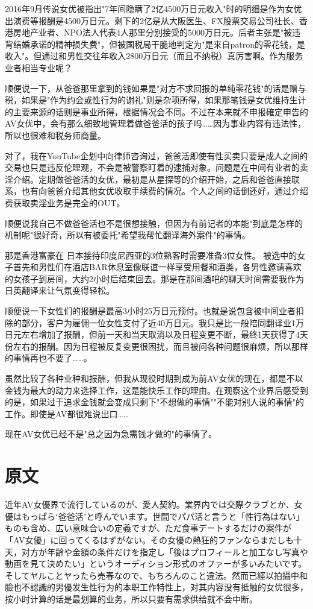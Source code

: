 \documentclass[12pt,UTF8]{ctexbook}
\begin{document}
2016年9月传说女优被指出"7年间隐瞒了2亿4500万日元收入"时的明细是作为女优出演费等报酬是4500万日元。剩下的2亿是从大阪医生、FX股票交易公司社长、香港房地产业者、NPO法人代表4人那里分别接受的5000万日元。后者主张是"被违背结婚承诺的精神损失费"，但被国税局干脆地判定为"是来自patron的零花钱，是收入"。但通过和男性交往年收入2800万日元（而且不纳税）真厉害啊。作为服务业者相当专业呢？

顺便说一下，从爸爸那里拿到的钱如果是"对方不求回报的单纯零花钱"的话是赠与税，如果是"作为约会或性行为的谢礼"则是杂项所得，如果那笔钱是女优维持生计的主要来源的话则是事业所得，根据情况会不同。不过在本来就不申报確定申告的AV女优中，会有那么细致地管理着做爸爸活的孩子吗……因为事业内容有违法性，所以也很难和税务师商量。

对了，我在YouTube企划中向律师咨询过，爸爸活即使有性买卖只要是成人之间的交易也只是违反伦理观，不会是被警察盯着的逮捕对象。问题是在中间有业者的卖淫介绍。定期做爸爸活的女优，最初是从星探等的介绍开始，之后和爸爸直接联系，也有向爸爸介绍其他女优收取手续费的情况。个人之间的话倒还好，通过介绍费获取卖淫业务是完全的OUT。

顺便说我自己不做爸爸活也不是很想接触，但因为有前记者的本能"到底是怎样的机制呢"很好奇，所以有被委托"希望我帮忙翻译海外案件"的事情。

那是香港富豪在 日本接待印度尼西亚的3位熟客时需要准备3位女性。 被选中的女子首先和男性们在酒店BAR休息室像联谊一样享受用餐和酒类，各男性邀请喜欢的女孩子到房间，大约2小时后结束回去。那是在那间酒吧的聊天时间需要我作为日英翻译来让气氛变得轻松。

顺便说一下女性们的报酬是最高3小时25万日元预付。也就是说包含被中间业者扣除的部分，客户为雇佣一位女性支付了近40万日元。我只是比一般陪同翻译业1万日元左右增加了报酬，但前一天和当天取消以及日程变更不断，最终1天获得了4天份左右的报酬。因为日程被反复变更很困扰，而且被问各种问题很麻烦，所以那样的事情再也不要了……。

虽然比较了各种业种和报酬，但我从现役时期到成为前AV女优的现在，都是不以金钱为最大的动力来选择工作，这是能快乐工作的理由。在观察这个业界后感受到的是，如果过于追求金钱就会变成只剩下"不想做的事情""不能对别人说的事情"的工作。即使是AV都很难说出口……

现在AV女优已经不是"总之因为急需钱才做的"的事情了。

\switchcolumn

\section*{原文}

近年AV女優界で流行しているのが、愛人契約。業界内では交際クラブとか、女優はもっぱらʻ爸爸活ʼと呼んでいます。世間でパパ活と言うと「性行為はない」ものも含め、広い意味合いの定義ですが、ただ食事デートするだけの案件が「AV女優」に回ってくるはずがない。その女優の熱狂的ファンならまだしも十天，对方が年齢や金額の条件だけを指定し「後はプロフィールと加工なし写真や動画を見て決めたい」というオーディション形式のオファーが多いみたいです。そしてヤルことヤったら売春なので、もちろんのこと違法。然而已經以拍攝中和臉也不認識的男優发生性行为的本职工作特性上，对其内容没有抵触的女优很多，按小时计算的话是最划算的业务，所以只要有需求供给就不会中断。
\end{document}
